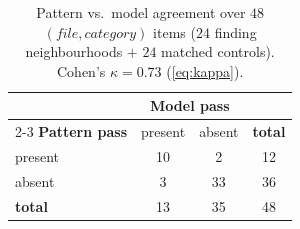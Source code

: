 \begin{table}[!htbp]
  \centering
  \caption{Pattern vs.\ model agreement over $48$
           $(\textit{file},\textit{category})$ items
           ($24$ finding neighbourhoods $+$ $24$ matched controls).
           Cohen's $\kappa = 0.73$ (\cref{eq:kappa}).}
  \label{tab:agreement}
  \renewcommand{\arraystretch}{1.2}
  \small
  \begin{tabular}{@{}l c c c@{}}
    \toprule
     & \multicolumn{2}{c}{\textbf{Model pass}} & \\
    \cmidrule(lr){2-3}
    \textbf{Pattern pass} & present & absent & \textbf{total} \\
    \midrule
    present        & 10 & \phantom{0}2 & 12 \\
    absent         & \phantom{0}3 & 33 & 36 \\
    \midrule
    \textbf{total} & 13 & 35 & 48 \\
    \bottomrule
  \end{tabular}
\end{table}
